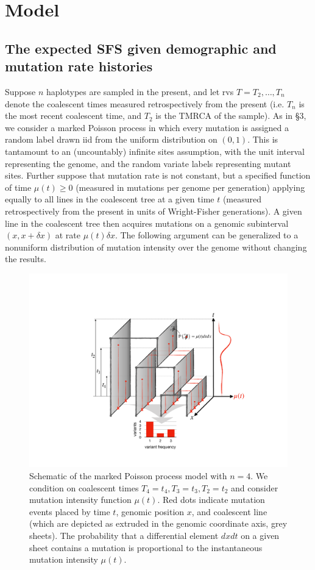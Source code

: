 \documentclass[11pt]{article}
\begin{document}
\section{Model}\label{sec:model}

\subsection{The expected SFS given demographic and mutation rate histories}\label{sec:model:xi}

Suppose $n$ haplotypes are sampled in the present, and let rvs $T = T_2,\dots,T_n$ denote the coalescent times measured retrospectively from the present (i.e. $T_n$ is the most recent coalescent time, and $T_2$ is the TMRCA of the sample).
As in \cite{Griffiths1998-qf} \S3, we consider a marked Poisson process in which every mutation is assigned a random label drawn iid from the uniform distribution on $(0,1)$.
This is tantamount to an (uncountably) infinite sites assumption, with the unit interval representing the genome, and the random variate labels representing mutant sites.
Further suppose that mutation rate is not constant, but a specified function of time $\mu(t) \ge 0$ (measured in mutations per genome per generation) applying equally to all lines in the coalescent tree at a given time $t$ (measured retrospectively from the present in units of Wright-Fisher generations).
A given line in the coalescent tree then acquires mutations on a genomic subinterval $(x,x+\delta x)$ at rate $\mu(t)\delta x$.
The following argument can be generalized to a nonuniform distribution of mutation intensity over the genome without changing the results.

\begin{figure}
\centering
\includegraphics[width=\textwidth]{figures/model}
\caption{Schematic of the marked Poisson process model with $n=4$.
We condition on coalescent times $T_4=t_4,T_3=t_3,T_2=t_2$ and consider mutation intensity function $\mu(t)$.
Red dots indicate mutation events placed by time $t$, genomic position $x$, and coalescent line (which are depicted as extruded in the genomic coordinate axis, grey sheets).
The probability that a differential element $dxdt$ on a given sheet contains a mutation is proportional to the instantaneous mutation intensity $\mu(t)$.
}
\label{fig:model}
\end{figure}
\end{document}
